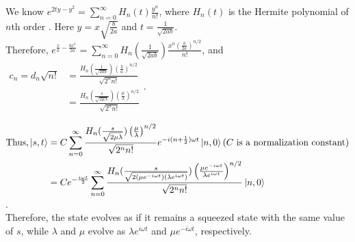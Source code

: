 \documentclass[12pt, twoside]{article}
\begin{document}
We know $e^{2ty -y^2} = \sum _ { n = 0 } ^ { \infty } H _ { n } ( t ) \frac { y ^ { n } } { n ! }$, where $H_n(t)$ is the Hermite polynomial of $n$th order \cite{arfken_weber_harris}. Here $y = x \sqrt{\frac{b}{2a}}$ and $t = \frac{1}{\sqrt{2ab}}$. \\ Therefore, $e^{\frac{x}{a} - \frac{bx^2}{2a}} = \sum _ { n = 0 } ^ { \infty } H _ { n }( \frac{1}{\sqrt { 2 a b } }) \frac {x ^ { n } \left( \frac { b } { 2 a } \right) ^ { n / 2 } } { n ! }$, and \\$\begin{aligned}c_n = d_n \sqrt{n!} &= \frac{ H_n ( \frac { 1 } { \sqrt { 2 a b } }) \left( \frac { b } { a } \right) ^ { n / 2 }}{\sqrt{2^n n!}}\\ &=\frac{ H_n ( \frac { s } { \sqrt { 2 \mu \lambda } }) \left( \frac { \mu } { \lambda } \right) ^ { n / 2 }}{\sqrt{2^n n!}}\end{aligned}$.

$\begin{aligned}\text{Thus,}\ket{s,t} &= C \sum _ { n = 0 } ^ { \infty } \frac{ H_n ( \frac { s } { \sqrt { 2 \mu \lambda } }) \left( \frac { \mu } { \lambda } \right) ^ { n / 2 }}{\sqrt{2^n n!}} e^{-i(n+\frac{1}{2})\omega t}\ket{n,0} (C \text{ is a normalization constant}) \\ &= C e^{-\frac{i\omega t}{2}}\sum _ { n = 0 } ^ { \infty } \frac{ H_n ( \frac { s } { \sqrt { 2 (\mu e^{-i\omega t}) (\lambda e^{i\omega t}) } }) \left( \frac { \mu e^{-i\omega t}} { \lambda e^{i\omega t} } \right) ^ { n / 2 }}{\sqrt{2^n n!}}\ket{n,0} \end{aligned}$.\\ Therefore, the state evolves as if it remains a squeezed state with the same value of $s$, while $\lambda$ and $\mu$ evolve as $ \lambda e^{i\omega t}$ and $\mu e^{-i\omega t}$, respectively.
\end{document}
